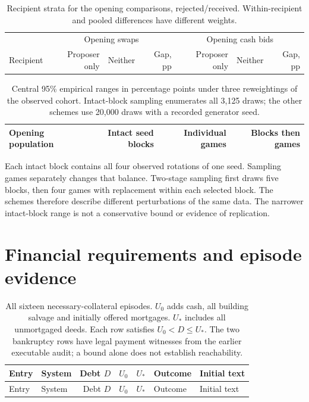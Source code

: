 \begin{table}[ht]\centering\small
\begin{tabular}{@{}lrrrrrr@{}}\toprule
&\multicolumn{3}{c}{Opening swaps}&\multicolumn{3}{c}{Opening cash bids}\\
Recipient & Proposer only & Neither & Gap, pp & Proposer only & Neither & Gap, pp\\\midrule

\end{tabular}
\caption{Recipient strata for the opening comparisons, rejected/received. Within-recipient and pooled differences have different weights.}
\end{table}

\begin{table}[ht]\centering\small
\begin{tabular}{@{}lrrr@{}}\toprule
Opening population & Intact seed blocks & Individual games & Blocks then games\\\midrule

\end{tabular}
\caption{Central 95\% empirical ranges in percentage points under three reweightings of the observed cohort. Intact-block sampling enumerates all 3,125 draws; the other schemes use 20,000 draws with a recorded generator seed.}
\end{table}

Each intact block contains all four observed rotations of one seed. Sampling games separately changes that balance. Two-stage sampling first draws five blocks, then four games with replacement within each selected block. The schemes therefore describe different perturbations of the same data. The narrower intact-block range is not a conservative bound or evidence of replication.



\section{Financial requirements and episode evidence}
\label{app:finance}
\begin{longtable}{@{}llrrrll@{}}
\caption{All sixteen necessary-collateral episodes. $U_0$ adds cash, all building salvage and initially offered mortgages. $U_*$ includes all unmortgaged deeds. Each row satisfies $U_0<D\leq U_*$. The two bankruptcy rows have legal payment witnesses from the earlier executable audit; a bound alone does not establish reachability.}\label{tab:necessary}\\
\toprule Entry & System & Debt $D$ & $U_0$ & $U_*$ & Outcome & Initial text\\\midrule\endfirsthead
\toprule Entry & System & Debt $D$ & $U_0$ & $U_*$ & Outcome & Initial text\\\midrule\endhead

\end{longtable}

